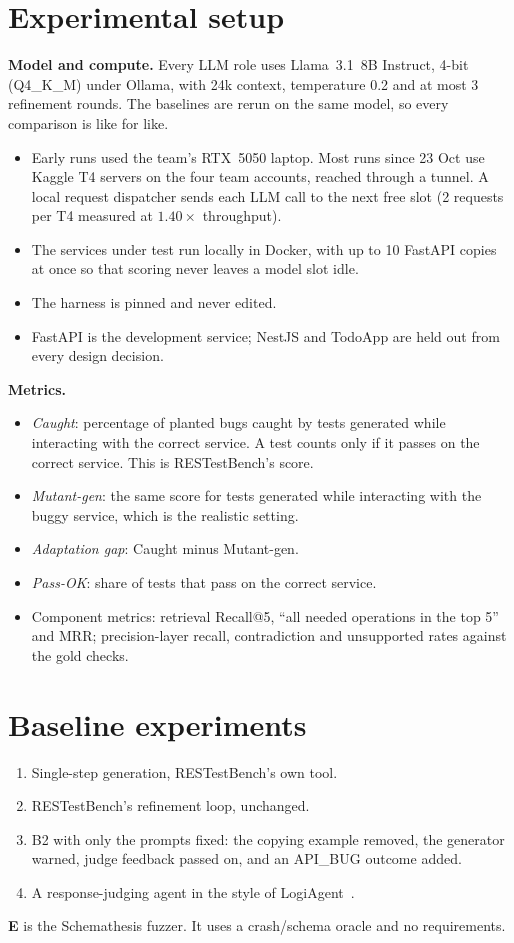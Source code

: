 \documentclass[11pt,a4paper]{article}
\begin{document}
\section{Experimental setup}
\textbf{Model and compute.} Every LLM role uses Llama~3.1~8B Instruct, 4-bit (Q4\_K\_M) under Ollama, with 24k context, temperature 0.2 and at most 3 refinement rounds. The baselines are rerun on the same model, so every comparison is like for like.
\begin{itemize}
\item Early runs used the team's RTX~5050 laptop. Most runs since 23 Oct use Kaggle T4 servers on the four team accounts, reached through a tunnel. A local request dispatcher sends each LLM call to the next free slot (2 requests per T4 measured at $1.40\times$ throughput).
\item The services under test run locally in Docker, with up to 10 FastAPI copies at once so that scoring never leaves a model slot idle.
\item The harness is pinned and never edited.
\item FastAPI is the development service; NestJS and TodoApp are held out from every design decision.
\end{itemize}

\textbf{Metrics.}
\begin{itemize}
\item \emph{Caught}: percentage of planted bugs caught by tests generated while interacting with the correct service. A test counts only if it passes on the correct service. This is RESTestBench's score.
\item \emph{Mutant-gen}: the same score for tests generated while interacting with the buggy service, which is the realistic setting.
\item \emph{Adaptation gap}: Caught minus Mutant-gen.
\item \emph{Pass-OK}: share of tests that pass on the correct service.
\item Component metrics: retrieval Recall@5, ``all needed operations in the top 5'' and MRR; precision-layer recall, contradiction and unsupported rates against the gold checks.
\end{itemize}

\section{Baseline experiments}
\begin{enumerate}[label=\textbf{B\arabic*}]
\item Single-step generation, RESTestBench's own tool.
\item RESTestBench's refinement loop, unchanged.
\item B2 with only the prompts fixed: the copying example removed, the generator warned, judge feedback passed on, and an \textsc{API\_BUG} outcome added.
\item A response-judging agent in the style of LogiAgent~\cite{logiagent}.
\end{enumerate}
\textbf{E} is the Schemathesis fuzzer. It uses a crash/schema oracle and no requirements.
\end{document}

